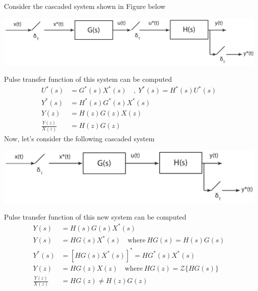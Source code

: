 \documentclass[twoside]{article}
\begin{document}
Consider the cascaded system shown in Figure below
%
    \begin{center}
\begin{minipage}[h]{0.9\linewidth}
    \begin{center}
      \includegraphics[width=\textwidth]{cascade1}
    \end{center}
\end{minipage}
    \end{center}
%
Pulse transfer function of this system can be computed
%
\begin{align*}
U^*(s) &=  G^*(s) X^*(s) \quad , \ Y^*(s) = H^*(s) U^*(s)
\\
Y^*(s) &= H^*(s) G^*(s) X^*(s)
\\
Y(z) &= H(z) G(z) X(z)
\\
\frac{Y(z)}{X(z)} &= H(z) G(z)
\end{align*}
%
Now, let's consider the following cascaded system 
%
    \begin{center}
\begin{minipage}[h]{0.9\linewidth}
    \begin{center}
      \includegraphics[width=\textwidth]{cascade2}
    \end{center}
\end{minipage}
    \end{center}
%
Pulse transfer function of this new system can be computed
%
\begin{align*}
Y(s) &= H(s) G(s) X^*(s) \\
Y(s) &= HG(s) X^*(s) \quad \mathrm{where} \ HG(s) = H(s) G(s) \\
Y^*(s) &= \left[ HG(s) X^*(s) \right]^* = HG^*(s) X^*(s)
\\
Y(z) &= HG(z) X(z) \quad \mathrm{where} \ HG(z) = \mathcal{Z} \lbrace HG(s) \rbrace\\
\frac{Y(z)}{X(z)} &= HG(z) \neq H(z) G(z)
\end{align*}
\end{document}

